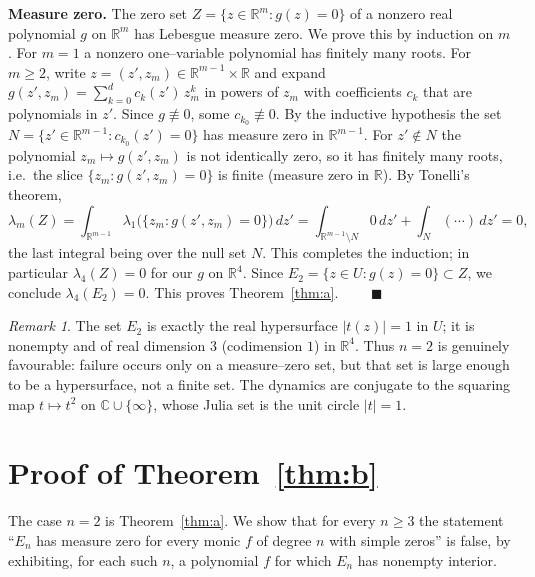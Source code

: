 \documentclass{amsart}
\theoremstyle{definition}
\theoremstyle{remark}
\newtheorem{remark}{Remark}
\newcommand{\C}{\mathbb{C}}
\newcommand{\R}{\mathbb{R}}
\begin{document}
\textbf{Measure zero.} The zero set $Z=\{z\in\R^m:g(z)=0\}$ of a nonzero real polynomial
$g$ on $\R^m$ has Lebesgue measure zero. We prove this by induction on $m$. For $m=1$ a
nonzero one--variable polynomial has finitely many roots. For $m\ge2$, write
$z=(z',z_m)\in\R^{m-1}\times\R$ and expand
$g(z',z_m)=\sum_{k=0}^{d}c_k(z')\,z_m^{k}$ in powers of $z_m$ with coefficients $c_k$ that
are polynomials in $z'$. Since $g\not\equiv0$, some $c_{k_0}\not\equiv0$. By the inductive
hypothesis the set $N=\{z'\in\R^{m-1}:c_{k_0}(z')=0\}$ has measure zero in $\R^{m-1}$. For
$z'\notin N$ the polynomial $z_m\mapsto g(z',z_m)$ is not identically zero, so it has finitely
many roots, i.e.\ the slice $\{z_m:g(z',z_m)=0\}$ is finite (measure zero in $\R$). By
Tonelli's theorem,
\[
\lambda_m(Z)=\int_{\R^{m-1}}\lambda_1\bigl(\{z_m:g(z',z_m)=0\}\bigr)\,dz'
=\int_{\R^{m-1}\setminus N}0\,dz'+\int_{N}(\cdots)\,dz'=0,
\]
the last integral being over the null set $N$. This completes the induction; in particular
$\lambda_4(Z)=0$ for our $g$ on $\R^4$. Since $E_2=\{z\in U:g(z)=0\}\subset Z$, we conclude
$\lambda_4(E_2)=0$. This proves Theorem~\ref{thm:a}. $\qquad\blacksquare$

\begin{remark}
The set $E_2$ is exactly the real hypersurface $|t(z)|=1$ in $U$; it is nonempty and of real
dimension $3$ (codimension $1$) in $\R^4$. Thus $n=2$ is genuinely favourable: failure occurs
only on a measure--zero set, but that set is large enough to be a hypersurface, not a finite
set. The dynamics are conjugate to the squaring map $t\mapsto t^2$ on $\C\cup\{\infty\}$,
whose Julia set is the unit circle $|t|=1$.
\end{remark}

\section{Proof of Theorem~\ref{thm:b}}

The case $n=2$ is Theorem~\ref{thm:a}. We show that for every $n\ge3$ the statement
``$E_n$ has measure zero for every monic $f$ of degree $n$ with simple zeros'' is false, by
exhibiting, for each such $n$, a polynomial $f$ for which $E_n$ has nonempty interior.
\end{document}
